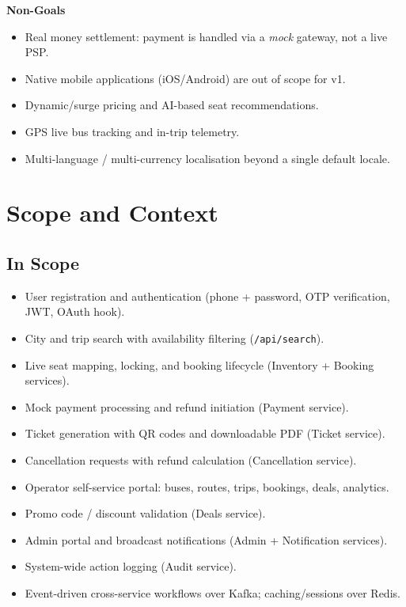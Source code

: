 \documentclass[11pt,a4paper]{article}
\begin{document}
\textbf{Non-Goals}
\begin{itemize}[leftmargin=1.4em]
  \item Real money settlement: payment is handled via a \emph{mock} gateway, not a live PSP.
  \item Native mobile applications (iOS/Android) are out of scope for v1.
  \item Dynamic/surge pricing and AI-based seat recommendations.
  \item GPS live bus tracking and in-trip telemetry.
  \item Multi-language / multi-currency localisation beyond a single default locale.
\end{itemize}

\section{Scope and Context}

\subsection{In Scope}
\begin{itemize}[leftmargin=1.4em]
  \item User registration and authentication (phone + password, OTP verification, JWT, OAuth hook).
  \item City and trip search with availability filtering (\texttt{/api/search}).
  \item Live seat mapping, locking, and booking lifecycle (Inventory + Booking services).
  \item Mock payment processing and refund initiation (Payment service).
  \item Ticket generation with QR codes and downloadable PDF (Ticket service).
  \item Cancellation requests with refund calculation (Cancellation service).
  \item Operator self-service portal: buses, routes, trips, bookings, deals, analytics.
  \item Promo code / discount validation (Deals service).
  \item Admin portal and broadcast notifications (Admin + Notification services).
  \item System-wide action logging (Audit service).
  \item Event-driven cross-service workflows over Kafka; caching/sessions over Redis.
\end{itemize}
\end{document}
